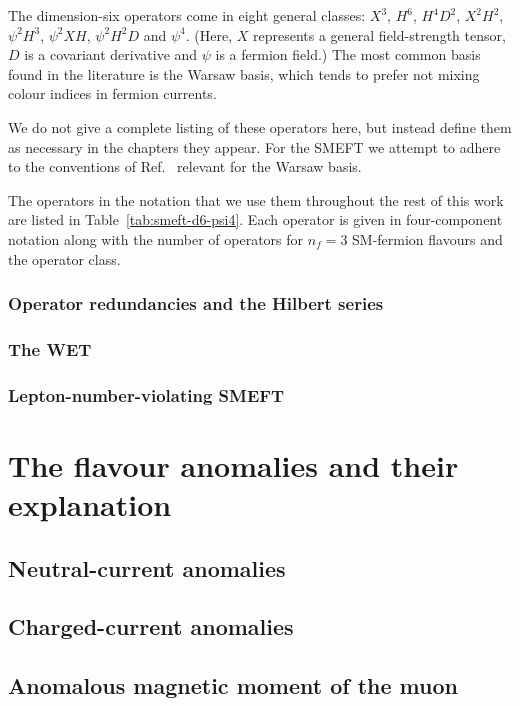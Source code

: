 The dimension-six operators come in eight general classes: $X^{3}$, $H^{6}$,
$H^{4}D^{2}$, $X^{2}H^{2}$, $\psi^{2}H^{3}$, $\psi^{2}XH$, $\psi^{2}H^{2}D$ and
$\psi^{4}$. (Here, $X$ represents a general field-strength tensor, $D$ is a
covariant derivative and $\psi$ is a fermion field.) The most common basis found
in the literature is the Warsaw basis, which tends to prefer not mixing colour
indices in fermion currents.

We do not give a complete listing of these operators here, but instead define
them as necessary in the chapters they appear. For the SMEFT we attempt to
adhere to the conventions of Ref.~\cite{} relevant for the Warsaw basis.

The operators in the notation that we use them throughout the rest of this work
are listed in Table~\ref{tab:smeft-d6-psi4}. Each operator is given in
four-component notation along with the number of operators for $n_{f} = 3$
SM-fermion flavours and the operator class.


\subsubsection{Operator redundancies and the Hilbert series}
\lipsum[2]

\subsubsection{The WET}
\lipsum[2]

\subsubsection{Lepton-number-violating SMEFT}
\lipsum[2]

\section{The flavour anomalies and their explanation}
\lipsum[2]

\subsection{Neutral-current anomalies}
\lipsum[2]

\subsection{Charged-current anomalies}
\lipsum[2]

\subsection{Anomalous magnetic moment of the muon}
\lipsum[2]

